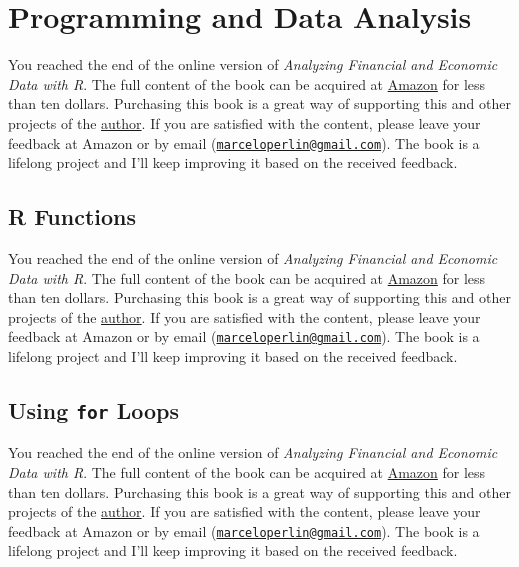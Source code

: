 \documentclass[
  12pt,
]{book}
\newenvironment{pleasebuyit}
{\begin{noteblock}
		
	} {\end{noteblock}}
\begin{document}
\hypertarget{programming}{%
\chapter{Programming and Data Analysis}\label{programming}}

\begin{pleasebuyit}
You reached the end of the online version of \emph{Analyzing Financial
and Economic Data with R}. The full content of the book can be acquired
at \href{https://www.amazon.com/dp/B084LSNXMN}{Amazon} for less than ten
dollars. Purchasing this book is a great way of supporting this and
other projects of the \href{https://www.msperlin.com/blog/}{author}. If
you are satisfied with the content, please leave your feedback at Amazon
or by email
(\href{mailto:marceloperlin@gmail.com}{\nolinkurl{marceloperlin@gmail.com}}).
The book is a lifelong project and I'll keep improving it based on the
received feedback.
\end{pleasebuyit}

\hypertarget{r-functions}{%
\section{R Functions}\label{r-functions}}

\begin{pleasebuyit}
You reached the end of the online version of \emph{Analyzing Financial
and Economic Data with R}. The full content of the book can be acquired
at \href{https://www.amazon.com/dp/B084LSNXMN}{Amazon} for less than ten
dollars. Purchasing this book is a great way of supporting this and
other projects of the \href{https://www.msperlin.com/blog/}{author}. If
you are satisfied with the content, please leave your feedback at Amazon
or by email
(\href{mailto:marceloperlin@gmail.com}{\nolinkurl{marceloperlin@gmail.com}}).
The book is a lifelong project and I'll keep improving it based on the
received feedback.
\end{pleasebuyit}

\hypertarget{using-for-loops}{%
\section{\texorpdfstring{Using \texttt{for} Loops}{Using for Loops}}\label{using-for-loops}}

\begin{pleasebuyit}
You reached the end of the online version of \emph{Analyzing Financial
and Economic Data with R}. The full content of the book can be acquired
at \href{https://www.amazon.com/dp/B084LSNXMN}{Amazon} for less than ten
dollars. Purchasing this book is a great way of supporting this and
other projects of the \href{https://www.msperlin.com/blog/}{author}. If
you are satisfied with the content, please leave your feedback at Amazon
or by email
(\href{mailto:marceloperlin@gmail.com}{\nolinkurl{marceloperlin@gmail.com}}).
The book is a lifelong project and I'll keep improving it based on the
received feedback.
\end{pleasebuyit}
\end{document}

